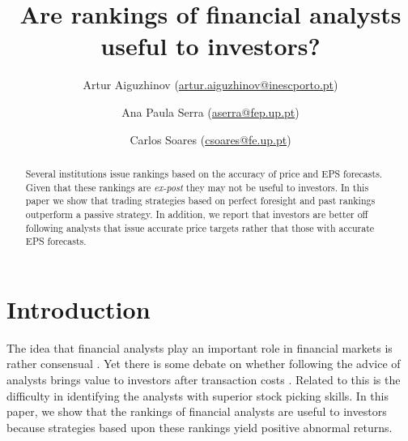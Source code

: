 \documentclass{article}\usepackage[]{graphicx}\usepackage[]{color}
\begin{document}
\title{Are rankings of financial analysts useful to investors?}
 \author[1,2]{ Artur Aiguzhinov (\href{mailto:artur.aiguzhinov@inescporto.pt}{artur.aiguzhinov@inescporto.pt})}
 \author[1]{ Ana Paula Serra (\href{mailto:aserra@fep.up.pt}{aserra@fep.up.pt})}
 \author[2,4]{Carlos Soares (\href{mailto:csoares@fe.up.pt}{csoares@fe.up.pt})}



\maketitle

\begin{abstract}
Several institutions issue rankings based on the accuracy of price and EPS forecasts. Given that these rankings are \textit{ex-post} they may not be useful to investors. In this paper  we show that trading strategies based on perfect foresight and past rankings outperform a passive strategy.  In addition, we report that investors are better off following analysts that issue  accurate price targets rather that those with accurate EPS forecasts. 
\end{abstract}

\section{Introduction}
\label{sec:intro}

The idea that financial analysts play an important role in financial markets is rather consensual \citep{cowles1933csm,obrien1990}. Yet there is some debate on whether following the advice of analysts brings value to investors after transaction costs \citep{womack1996,mikhail2004sae,li2005persistence}. Related to this is the difficulty in identifying the analysts with superior stock picking skills. In this paper, we show that the rankings of financial analysts are useful to investors because strategies based upon these rankings yield positive abnormal returns.
\end{document}
